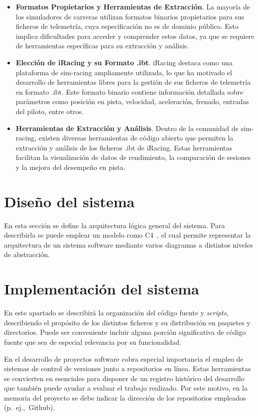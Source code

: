 \begin{itemize}
\item \textbf{Formatos Propietarios y Herramientas de Extracción}. La mayoría de los simuladores de carreras utilizan formatos binarios propietarios para sus ficheros de telemetría, cuya especificación no es de dominio público. Esto implica dificultades para acceder y comprender estos datos, ya que se requiere de herramientas específicas para su extracción y análisis.

\item \textbf{Elección de iRacing y su Formato .ibt}. iRacing destaca como una plataforma de sim-racing ampliamente utilizada, lo que ha motivado el desarrollo de herramientas libres para la gestión de sus ficheros de telemetría en formato .ibt. Este formato binario contiene información detallada sobre parámetros como posición en pista, velocidad, aceleración, frenado, entradas del piloto, entre otros.
\item \textbf{Herramientas de Extracción y Análisis}. Dentro de la comunidad de sim-racing, existen diversas herramientas de código abierto que permiten la extracción y análisis de los ficheros .ibt de iRacing. Estas herramientas facilitan la visualización de datos de rendimiento, la comparación de sesiones y la mejora del desempeño en pista.
\end{itemize}

\section{Diseño del sistema}
En esta sección se define la arquitectura lógica general del sistema. Para describirla se puede emplear un modelo como C4~\cite{Brown22}, el cual permite representar la arquitectura de un sistema software mediante varios diagramas a distintos niveles de abstracción.

\section{Implementación del sistema}
En este apartado se describirá la organización del código fuente y \emph{scripts}, describiendo el propósito de los distintos ficheros y su distribución en paquetes y directorios. Puede ser conveniente incluir alguna porción significativa de código fuente que sea de especial relevancia por su funcionalidad.

En el desarrollo de proyectos software cobra especial importancia el empleo de sistemas de control de versiones junto a repositorios en línea. Estas herramientas se convierten en esenciales para disponer de un registro histórico del desarrollo que también puede ayudar a evaluar el trabajo realizado. Por este motivo, en la memoria del proyecto se debe indicar la dirección de los repositorios empleados (p.~ej.,~Github).

